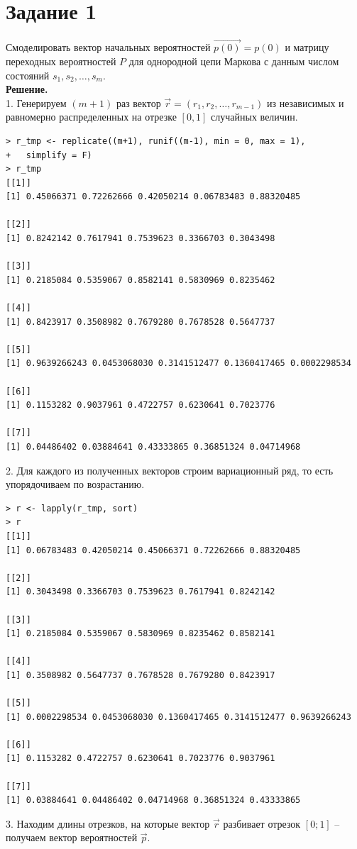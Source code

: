 \documentclass[14pt,a4paper]{scrartcl}
\begin{document}
\section*{Задание 1}

Смоделировать вектор начальных вероятностей $\vec{p(0)} = p(0)$ и матрицу переходных вероятностей $P$ для однородной цепи Маркова с данным числом состояний ${s_1,s_2,…,s_m}$.\\
\textbf{Решение.}\\
1. Генерируем $(m+1)$ раз вектор $\vec{r}=(r_1,r_2,…,r_{m-1})$ из независимых и равномерно распределенных на отрезке $[0,1]$ случайных величин.
\begin{verbatim}
> r_tmp <- replicate((m+1), runif((m-1), min = 0, max = 1), 
+	simplify = F)
> r_tmp
[[1]]
[1] 0.45066371 0.72262666 0.42050214 0.06783483 0.88320485

[[2]]
[1] 0.8242142 0.7617941 0.7539623 0.3366703 0.3043498

[[3]]
[1] 0.2185084 0.5359067 0.8582141 0.5830969 0.8235462

[[4]]
[1] 0.8423917 0.3508982 0.7679280 0.7678528 0.5647737

[[5]]
[1] 0.9639266243 0.0453068030 0.3141512477 0.1360417465 0.0002298534

[[6]]
[1] 0.1153282 0.9037961 0.4722757 0.6230641 0.7023776

[[7]]
[1] 0.04486402 0.03884641 0.43333865 0.36851324 0.04714968
\end{verbatim}


2. Для каждого из полученных векторов строим вариационный ряд, то есть упорядочиваем по возрастанию.

\begin{verbatim}
> r <- lapply(r_tmp, sort)
> r
[[1]]
[1] 0.06783483 0.42050214 0.45066371 0.72262666 0.88320485

[[2]]
[1] 0.3043498 0.3366703 0.7539623 0.7617941 0.8242142

[[3]]
[1] 0.2185084 0.5359067 0.5830969 0.8235462 0.8582141

[[4]]
[1] 0.3508982 0.5647737 0.7678528 0.7679280 0.8423917

[[5]]
[1] 0.0002298534 0.0453068030 0.1360417465 0.3141512477 0.9639266243

[[6]]
[1] 0.1153282 0.4722757 0.6230641 0.7023776 0.9037961

[[7]]
[1] 0.03884641 0.04486402 0.04714968 0.36851324 0.43333865
\end{verbatim}

3. Находим длины отрезков, на которые вектор $\vec{r}$ разбивает отрезок $[0;1]$ -- получаем вектор вероятностей $\vec{p}$.
\end{document}
